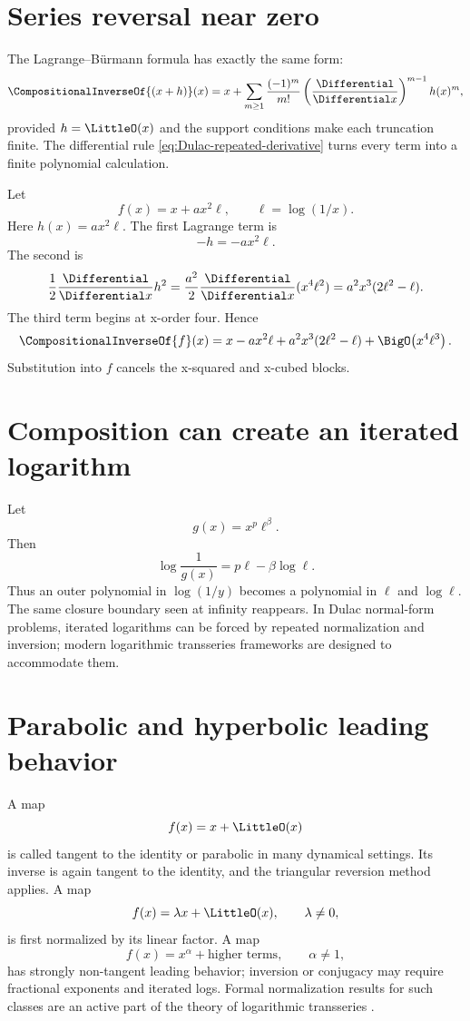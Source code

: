 \documentclass[11pt,openany]{book}
\theoremstyle{definition}
\theoremstyle{plain}
\theoremstyle{remark}
\newcommand{\rev}[1]{\CompositionalInverseOf{#1}}
\begin{document}
\section{Series reversal near zero}
The Lagrange--Bürmann formula has exactly the same form:
\begin{equation}\label{eq:small-Lagrange}
 \rev{(x+h)}(x)
 =x+\sum_{m\ge1}\frac{(-1)^m}{m!}
 \left(\frac{\Differential}{\Differential x}\right)^{m-1}h(x)^m,
\end{equation}
provided \(h=\LittleO(x)\) and the support conditions make each truncation finite.
The differential rule \cref{eq:Dulac-repeated-derivative} turns every term into
a finite polynomial calculation.

\begin{workedbox}[title={Reversing \(x+a x^2\log(1/x)\)}]
Let
\[
 f(x)=x+a x^2\ell,
 \qquad \ell=\log(1/x).
\]
Here \(h(x)=a x^2\ell\).  The first Lagrange term is
\[
 -h=-a x^2\ell.
\]
The second is
\[
 \frac12\frac{\Differential}{\Differential x}h^2
 =\frac{a^2}{2}\frac{\Differential}{\Differential x}(x^4\ell^2)
 =a^2x^3(2\ell^2-\ell).
\]
The third term begins at x-order four.  Hence
\begin{equation}\label{eq:small-inverse-example}
 \rev f(x)=x-a x^2\ell+a^2x^3(2\ell^2-\ell)
 +\BigO\!\left(x^4\ell^3\right).
\end{equation}
Substitution into \(f\) cancels the x-squared and x-cubed blocks.
\end{workedbox}

\section{Composition can create an iterated logarithm}
Let
\[
 g(x)=x^p\ell^\beta.
\]
Then
\begin{equation}\label{eq:small-nested-log}
 \log\frac1{g(x)}
 =p\ell-\beta\log\ell.
\end{equation}
Thus an outer polynomial in \(\log(1/y)\) becomes a polynomial in \(\ell\) and
\(\log\ell\).  The same closure boundary seen at infinity reappears.  In Dulac
normal-form problems, iterated logarithms can be forced by repeated
normalization and inversion; modern logarithmic transseries frameworks are
designed to accommodate them.

\section{Parabolic and hyperbolic leading behavior}
A map
\[
 f(x)=x+\LittleO(x)
\]
is called tangent to the identity or parabolic in many dynamical settings.  Its
inverse is again tangent to the identity, and the triangular reversion method
applies.  A map
\[
 f(x)=\lambda x+\LittleO(x),
 \qquad \lambda\ne0,
\]
is first normalized by its linear factor.  A map
\[
 f(x)=x^\alpha+\text{higher terms},
 \qquad \alpha\ne1,
\]
has strongly non-tangent leading behavior; inversion or conjugacy may require
fractional exponents and iterated logs.  Formal normalization results for such
classes are an active part of the theory of logarithmic transseries
\cite{mardesic-powerlog,peran-logarithmic}.
\end{document}
